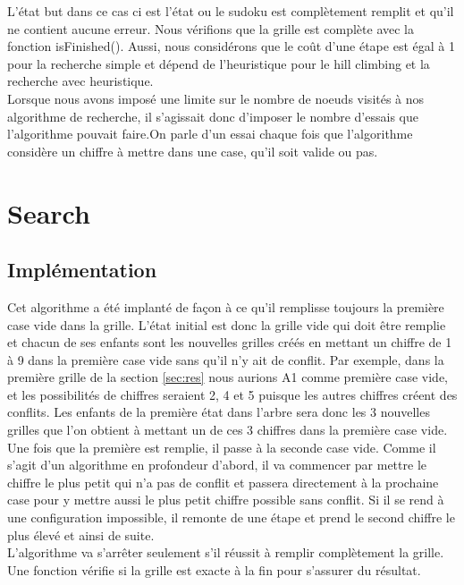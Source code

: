 \documentclass[a4paper,10pt]{article}
\begin{document}
L'état but dans ce cas ci est l'état ou le sudoku est complètement remplit et qu'il ne contient aucune erreur. Nous vérifions que la grille est complète avec la fonction isFinished(). Aussi, nous considérons que le coût d'une étape est égal à 1 pour la recherche simple et dépend de l'heuristique pour le hill climbing et la recherche avec heuristique.\\

Lorsque nous avons imposé une limite sur le nombre de noeuds visités à nos algorithme de recherche, il s'agissait donc d'imposer le nombre d'essais que l'algorithme pouvait faire.On parle d'un essai chaque fois que l'algorithme considère un chiffre à mettre dans une case, qu'il soit valide ou pas. 

\section{Search}
\subsection{Implémentation}
Cet algorithme a été implanté de façon à ce qu'il remplisse toujours la première case vide dans la grille. L'état initial est donc la grille vide qui doit être remplie et chacun de ses enfants sont les nouvelles grilles créés en mettant un chiffre de 1 à 9 dans la première case vide sans qu'il n'y ait de conflit. Par exemple, dans la première grille de la section \ref{sec:res} nous aurions A1 comme première case vide, et les possibilités de chiffres seraient 2, 4 et 5 puisque les autres chiffres créent des conflits. Les enfants de la première état dans l'arbre sera donc les 3 nouvelles grilles que l'on obtient à mettant un de ces 3 chiffres dans la première case vide. \\

Une fois que la première est remplie, il passe à la seconde case vide. Comme il s'agit d'un algorithme en profondeur d'abord, il va commencer par mettre le chiffre le plus petit qui n'a pas de conflit et passera directement à la prochaine case pour y mettre aussi le plus petit chiffre possible sans conflit. Si il se rend à une configuration impossible, il remonte de une étape et prend le second chiffre le plus élevé et ainsi de suite.\\

L'algorithme va s'arrêter seulement s'il réussit à remplir complètement la grille. Une fonction vérifie si la grille est exacte à la fin pour s'assurer du résultat.
\end{document}
